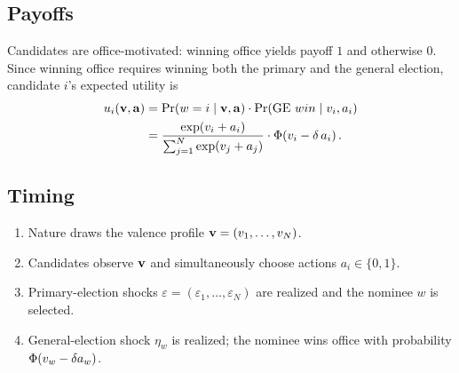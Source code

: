 \subsection{Payoffs}
Candidates are office-motivated: winning office yields payoff $1$ and otherwise $0$. Since winning office requires winning both the primary and the general election, candidate $i$'s expected utility is
\begin{align*}
    u_i(\mathbf v,\mathbf a)
    &= \Pr(w=i\mid\mathbf v,\mathbf a)\cdot \Pr(\text{GE}\ win \mid v_i,a_i)\\
    &= \frac{\exp\!\left(v_i + a_i\right)}{\sum_{j=1}^N \exp\!\left(v_j+a_j\right)}
       \cdot \Phi\!\left(v_i-\delta\,a_i\right).
\end{align*}

\subsection{Timing}
\begin{enumerate}
    \item Nature draws the valence profile $\mathbf v=(v_1,\dots,v_N)$.
    \item Candidates observe $\mathbf v$ and simultaneously choose actions $a_i\in\{0,1\}$.
    \item Primary-election shocks $\varepsilon=(\varepsilon_1,\dots,\varepsilon_N)$ are realized and the nominee $w$ is selected.
    \item General-election shock $\eta_w$ is realized; the nominee wins office with probability $\Phi(v_w-\delta a_w)$.
\end{enumerate}